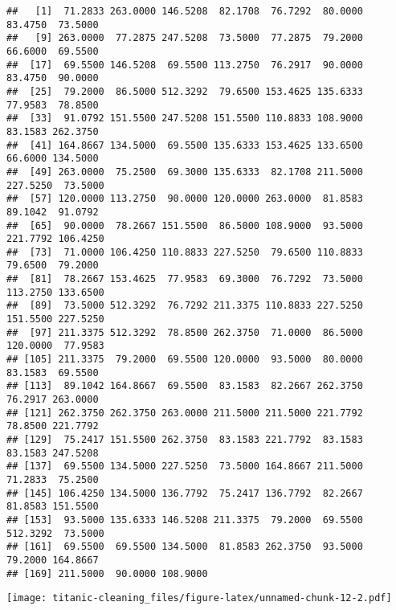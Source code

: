 \documentclass[]{article}
\newenvironment{Shaded}{\begin{snugshade}}{\end{snugshade}}
\newcommand{\DataTypeTok}[1]{\textcolor[rgb]{0.13,0.29,0.53}{#1}}
\newcommand{\KeywordTok}[1]{\textcolor[rgb]{0.13,0.29,0.53}{\textbf{#1}}}
\newcommand{\NormalTok}[1]{#1}
\newcommand{\OperatorTok}[1]{\textcolor[rgb]{0.81,0.36,0.00}{\textbf{#1}}}
\newcommand{\StringTok}[1]{\textcolor[rgb]{0.31,0.60,0.02}{#1}}
\begin{document}
\begin{verbatim}
##   [1]  71.2833 263.0000 146.5208  82.1708  76.7292  80.0000  83.4750  73.5000
##   [9] 263.0000  77.2875 247.5208  73.5000  77.2875  79.2000  66.6000  69.5500
##  [17]  69.5500 146.5208  69.5500 113.2750  76.2917  90.0000  83.4750  90.0000
##  [25]  79.2000  86.5000 512.3292  79.6500 153.4625 135.6333  77.9583  78.8500
##  [33]  91.0792 151.5500 247.5208 151.5500 110.8833 108.9000  83.1583 262.3750
##  [41] 164.8667 134.5000  69.5500 135.6333 153.4625 133.6500  66.6000 134.5000
##  [49] 263.0000  75.2500  69.3000 135.6333  82.1708 211.5000 227.5250  73.5000
##  [57] 120.0000 113.2750  90.0000 120.0000 263.0000  81.8583  89.1042  91.0792
##  [65]  90.0000  78.2667 151.5500  86.5000 108.9000  93.5000 221.7792 106.4250
##  [73]  71.0000 106.4250 110.8833 227.5250  79.6500 110.8833  79.6500  79.2000
##  [81]  78.2667 153.4625  77.9583  69.3000  76.7292  73.5000 113.2750 133.6500
##  [89]  73.5000 512.3292  76.7292 211.3375 110.8833 227.5250 151.5500 227.5250
##  [97] 211.3375 512.3292  78.8500 262.3750  71.0000  86.5000 120.0000  77.9583
## [105] 211.3375  79.2000  69.5500 120.0000  93.5000  80.0000  83.1583  69.5500
## [113]  89.1042 164.8667  69.5500  83.1583  82.2667 262.3750  76.2917 263.0000
## [121] 262.3750 262.3750 263.0000 211.5000 211.5000 221.7792  78.8500 221.7792
## [129]  75.2417 151.5500 262.3750  83.1583 221.7792  83.1583  83.1583 247.5208
## [137]  69.5500 134.5000 227.5250  73.5000 164.8667 211.5000  71.2833  75.2500
## [145] 106.4250 134.5000 136.7792  75.2417 136.7792  82.2667  81.8583 151.5500
## [153]  93.5000 135.6333 146.5208 211.3375  79.2000  69.5500 512.3292  73.5000
## [161]  69.5500  69.5500 134.5000  81.8583 262.3750  93.5000  79.2000 164.8667
## [169] 211.5000  90.0000 108.9000
\end{verbatim}

\begin{Shaded}
\end{Shaded}

\texttt{[image: titanic-cleaning\_files/figure-latex/unnamed-chunk-12-2.pdf]}

\begin{Shaded}
\end{Shaded}
\end{document}
